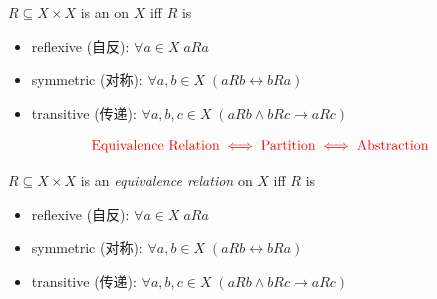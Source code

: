 
\begin{frame}{}
  \begin{definition}
    $R \subseteq X \times X$ is an  on $X$ iff $R$ is
    \begin{itemize}
      \item reflexive (自反): $\forall a \in X\; a R a$
      \item symmetric (对称): $\forall a, b \in X\; (a R b \leftrightarrow b R a)$
      \item transitive (传递): $\forall a, b, c \in X\; (a R b \land b R c \to a R c)$
    \end{itemize}
  \end{definition}

	\pause
  \vspace{1em}
  \[
    \textcolor{red}{\text{Equivalence Relation} \iff \text{Partition} \iff \text{Abstraction}}
  \]
\end{frame}

\begin{frame}{}
  \begin{definition}
    $R \subseteq X \times X$ is an {\it equivalence relation} on $X$ iff $R$ is
    \begin{itemize}
      \item reflexive (自反): $\forall a \in X\; a R a$
      \item symmetric (对称): $\forall a, b \in X\; (a R b \leftrightarrow b R a)$
      \item transitive (传递): $\forall a, b, c \in X\; (a R b \land b R c \to a R c)$
    \end{itemize}
  \end{definition}

	\begin{columns}
			\begin{center}
        \vspace{-1em}
			\end{center}
	\end{columns}
\end{frame}

